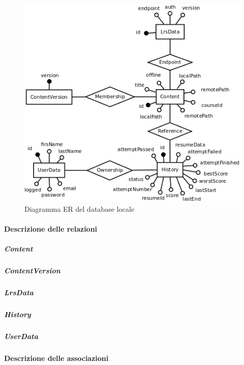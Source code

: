 \documentclass[../Tesi.tex]{subfiles}
\begin{document}
			\begin{figure} [H]
				\centering
				\includegraphics[scale=0.9]{images/er/RealmDB}
					\caption{Diagramma ER del database locale}
			\end{figure}

			\paragraph{Descrizione delle relazioni}
			\subparagraph*{Content}
			\subparagraph*{ContentVersion}
			\subparagraph*{LrsData}
			\subparagraph*{History}
			\subparagraph*{UserData}

			\paragraph{Descrizione delle associazioni}
\end{document}
